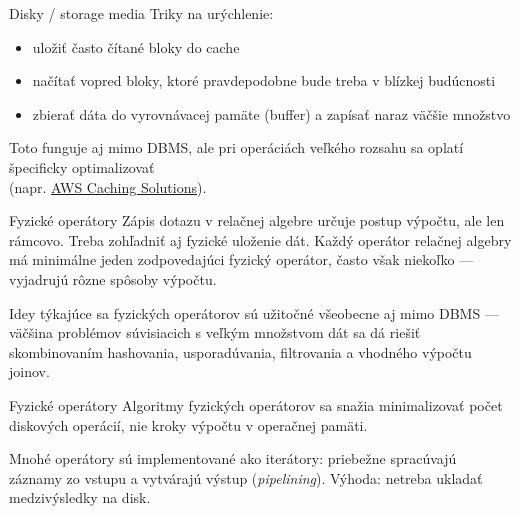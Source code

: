 \documentclass[12pt]{beamer}
\begin{document}
\begin{frame}[fragile]{Disky / storage media}
Triky na urýchlenie:
\begin{itemize}
\item uložiť často čítané bloky do cache
\item načítať vopred bloky, ktoré pravdepodobne bude treba v blízkej budúcnosti
\item zbierať dáta do vyrovnávacej pamäte (buffer) a zapísať naraz väčšie množstvo
\end{itemize}
Toto funguje aj mimo DBMS, ale pri operáciách veľkého rozsahu sa oplatí špecificky optimalizovať\\
(napr. \href{https://aws.amazon.com/caching/aws-caching/}{AWS Caching Solutions}).
\end{frame}

\begin{frame}[fragile]{Fyzické operátory}
Zápis dotazu v relačnej algebre určuje postup výpočtu, ale len rámcovo.
Treba zohľadniť aj fyzické uloženie dát.
Každý operátor relačnej algebry má minimálne jeden zodpovedajúci fyzický operátor,
často však niekoľko --- vyjadrujú rôzne spôsoby výpočtu.
\bigskip

Idey týkajúce sa fyzických operátorov sú užitočné všeobecne aj mimo DBMS
--- väčšina problémov súvisiacich s veľkým množstvom dát sa dá riešiť
skombinovaním hashovania, usporadúvania, filtrovania a vhodného výpočtu joinov.
\end{frame}

\begin{frame}[fragile]{Fyzické operátory}
Algoritmy fyzických operátorov sa snažia minimalizovať počet diskových operácií,
nie kroky výpočtu v operačnej pamäti.
\bigskip

Mnohé operátory sú implementované ako iterátory:
priebežne spracúvajú záznamy zo vstupu a vytvárajú výstup (\emph{pipelining}).
Výhoda: netreba ukladať medzivýsledky na disk.
\end{frame}
\end{document}
